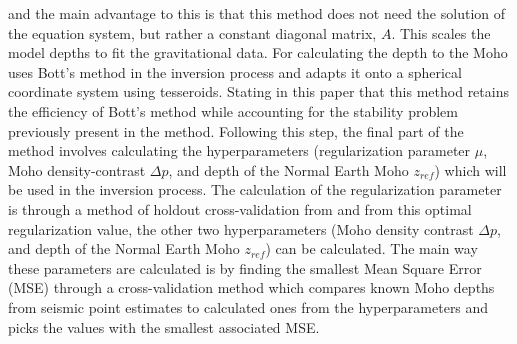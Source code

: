 and the main advantage to this is that this method does not need the solution of the equation system, but rather a constant diagonal matrix, $A$. This scales the model depths to fit the gravitational data.
For calculating the depth to the Moho \cite{Uieda2016} uses Bott's method in the inversion process and adapts it onto a spherical coordinate system using tesseroids. Stating in this paper that this method retains the efficiency of Bott's method while accounting for the stability problem previously present in the method. Following this step, the final part of the method involves calculating the hyperparameters (regularization parameter $\mu$, Moho density-contrast $\Delta p$, and depth of the Normal Earth Moho $z_{ref}$) which will be used in the inversion process. The calculation of the regularization parameter is through a method of holdout cross-validation from \cite{Hansen1992} and from this optimal regularization value, the other two hyperparameters (Moho density contrast $\Delta p$, and depth of the Normal Earth Moho $z_{ref}$) can be calculated. The main way these parameters are calculated is by finding the smallest Mean Square Error (MSE) through a cross-validation method which compares known Moho depths from seismic point estimates to calculated ones from the hyperparameters and picks the values with the smallest associated MSE.
